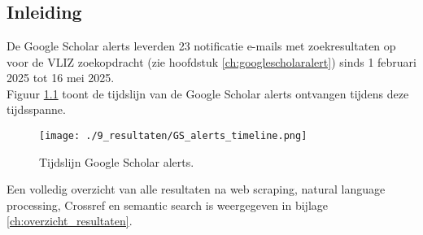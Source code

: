 
\chapter{}%
\label{ch:resultaten}

\section{Inleiding}
De Google Scholar alerts leverden 23 notificatie e-mails met zoekresultaten op voor de VLIZ zoekopdracht (zie hoofdstuk \ref{ch:googlescholaralert}) sinds 1 februari 2025 tot 16 mei 2025.\\
Figuur \ref{fig:GSAlertsTimeline} toont de tijdslijn van de Google Scholar alerts ontvangen tijdens deze tijdsspanne.
\begin{figure}[h!]
    \centering
    \texttt{[image: ./9\_resultaten/GS\_alerts\_timeline.png]}
    \caption[Tijdslijn Google Scholar alerts.]{\label{fig:GSAlertsTimeline}Tijdslijn Google Scholar alerts.}
\end{figure}
Een volledig overzicht van alle resultaten na web scraping, natural language processing, Crossref en semantic search is weergegeven in bijlage \ref{ch:overzicht_resultaten}.

